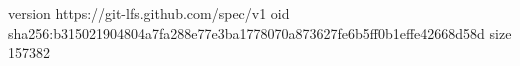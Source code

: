 version https://git-lfs.github.com/spec/v1
oid sha256:b315021904804a7fa288e77e3ba1778070a873627fe6b5ff0b1effe42668d58d
size 157382
